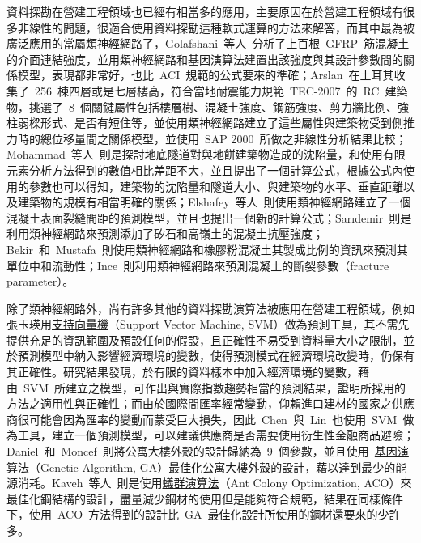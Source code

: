 資料探勘在營建工程領域也已經有相當多的應用，主要原因在於營建工程領域有很多非線性的問題，很適合使用資料探勘這種軟式運算的方法來解答，而其中最為被廣泛應用的當屬\underline{類神經網路}了，Golafshani~等人\cite{golafshani2014artificial}~分析了上百根~GFRP~筋混凝土的介面連結強度，並用類神經網路和基因演算法建置出該強度與其設計參數間的關係模型，表現都非常好，也比~ACI\cite{aci2006guide}~規範的公式要來的準確；Arslan\cite{arslan2010evaluation}~在土耳其收集了~256~棟四層或是七層樓高，符合當地耐震能力規範~TEC-2007~的~RC~建築物，挑選了~8~個關鍵屬性包括樓層樹、混凝土強度、鋼筋強度、剪力牆比例、強柱弱樑形式、是否有短住等，並使用類神經網路建立了這些屬性與建築物受到側推力時的總位移量間之關係模型，並使用~SAP 2000~所做之非線性分析結果比較；Mohammad~等人\cite{azadi2013assessment}~則是探討地底隧道對與地餅建築物造成的沈陷量，和使用有限元素分析方法得到的數值相比差距不大，並且提出了一個計算公式，根據公式內使用的參數也可以得知，建築物的沈陷量和隧道大小、與建築物的水平、垂直距離以及建築物的規模有相當明確的關係；Elshafey~等人\cite{elshafey2013predicting}~則使用類神經網路建立了一個混凝土表面裂縫間距的預測模型，並且也提出一個新的計算公式；Sarıdemir\cite{saridemir2009prediction}~則是利用類神經網路來預測添加了矽石和高嶺土的混凝土抗壓強度；Bekir~和~Mustafa\cite{topccu2008prediction}~則使用類神經網路和橡膠粉混凝土其製成比例的資訊來預測其單位中和流動性；Ince\cite{ince2004prediction}~則利用類神經網路來預測混凝土的斷裂參數（fracture parameter）。

除了類神經網路外，尚有許多其他的資料探勘演算法被應用在營建工程領域，例如張玉瑛\cite{chang2007master}用\underline{支持向量機}（Support Vector Machine, SVM）做為預測工具，其不需先提供充足的資訊範圍及預設任何的假設，且正確性不易受到資料量大小之限制，並於預測模型中納入影響經濟環境的變數，使得預測模式在經濟環境改變時，仍保有其正確性。研究結果發現，於有限的資料樣本中加入經濟環境的變數，藉由~SVM~所建立之模型，可作出與實際指數趨勢相當的預測結果，證明所採用的方法之適用性與正確性；而由於國際間匯率經常變動，仰賴進口建材的國家之供應商很可能會因為匯率的變動而蒙受巨大損失，因此~Chen~與~Lin\cite{chen2010developing}~也使用~SVM~做為工具，建立一個預測模型，可以建議供應商是否需要使用衍生性金融商品避險；Daniel~和~Moncef\cite{tuhus2010genetic}~則將公寓大樓外殼的設計歸納為~9~個參數，並且使用~\underline{基因演算法}（Genetic Algorithm, GA）最佳化公寓大樓外殼的設計，藉以達到最少的能源消耗。Kaveh~等人\cite{kaveh2010performance}~則是使用\underline{蟻群演算法}（Ant Colony Optimization, ACO）來最佳化鋼結構的設計，盡量減少鋼材的使用但是能夠符合規範，結果在同樣條件下，使用~ACO~方法得到的設計比~GA~最佳化設計所使用的鋼材還要來的少許多。

